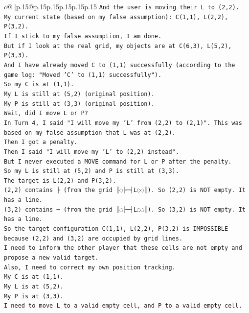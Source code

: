\documentclass{article}
\begin{document}
{\begin{supertabular}{c@{$\;$}|p{.15\linewidth}@{}p{.15\linewidth}p{.15\linewidth}p{.15\linewidth}p{.15\linewidth}p{.15\linewidth}}
{{{\texttt{And the user is moving their L to (2,2).} \\
\texttt{My current state (based on my false assumption): C(1,1), L(2,2), P(3,2).} \\
\texttt{If I stick to my false assumption, I am done.} \\
\texttt{But if I look at the real grid, my objects are at C(6,3), L(5,2), P(3,3).} \\
\texttt{And I have already moved C to (1,1) successfully (according to the game log: "Moved 'C' to (1,1) successfully").} \\
\texttt{So my C is at (1,1).} \\
\texttt{My L is still at (5,2) (original position).} \\
\texttt{My P is still at (3,3) (original position).} \\
\texttt{Wait, did I move L or P?} \\
\texttt{In Turn 4, I said "I will move my 'L' from (2,2) to (2,1)". This was based on my false assumption that L was at (2,2).} \\
\texttt{Then I got a penalty.} \\
\texttt{Then I said "I will move my 'L' to (2,2) instead".} \\
\texttt{But I never executed a MOVE command for L or P after the penalty.} \\
\texttt{So my L is still at (5,2) and P is still at (3,3).} \\
\texttt{The target is L(2,2) and P(3,2).} \\
\texttt{(2,2) contains ├ (from the grid ║◌├─┤L◌◌║). So (2,2) is NOT empty. It has a line.} \\
\texttt{(3,2) contains ─ (from the grid ║◌├─┤L◌◌║). So (3,2) is NOT empty. It has a line.} \\
\texttt{So the target configuration C(1,1), L(2,2), P(3,2) is IMPOSSIBLE because (2,2) and (3,2) are occupied by grid lines.} \\
\texttt{I need to inform the other player that these cells are not empty and propose a new valid target.} \\
\texttt{Also, I need to correct my own position tracking.} \\
\texttt{My C is at (1,1).} \\
\texttt{My L is at (5,2).} \\
\texttt{My P is at (3,3).} \\
\texttt{I need to move L to a valid empty cell, and P to a valid empty cell.} \\
}}}
\end{supertabular}}
\end{document}
